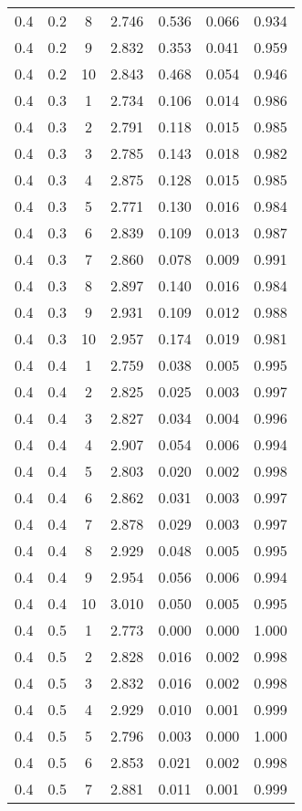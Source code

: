 \begin{tabular}{|c|c|c|c|c|c|c|}
0.4 & 0.2 & 8 & 2.746 & 0.536 & 0.066 & 0.934 \\
0.4 & 0.2 & 9 & 2.832 & 0.353 & 0.041 & 0.959 \\
0.4 & 0.2 & 10 & 2.843 & 0.468 & 0.054 & 0.946 \\
0.4 & 0.3 & 1 & 2.734 & 0.106 & 0.014 & 0.986 \\
0.4 & 0.3 & 2 & 2.791 & 0.118 & 0.015 & 0.985 \\
0.4 & 0.3 & 3 & 2.785 & 0.143 & 0.018 & 0.982 \\
0.4 & 0.3 & 4 & 2.875 & 0.128 & 0.015 & 0.985 \\
0.4 & 0.3 & 5 & 2.771 & 0.130 & 0.016 & 0.984 \\
0.4 & 0.3 & 6 & 2.839 & 0.109 & 0.013 & 0.987 \\
0.4 & 0.3 & 7 & 2.860 & 0.078 & 0.009 & 0.991 \\
0.4 & 0.3 & 8 & 2.897 & 0.140 & 0.016 & 0.984 \\
0.4 & 0.3 & 9 & 2.931 & 0.109 & 0.012 & 0.988 \\
0.4 & 0.3 & 10 & 2.957 & 0.174 & 0.019 & 0.981 \\
0.4 & 0.4 & 1 & 2.759 & 0.038 & 0.005 & 0.995 \\
0.4 & 0.4 & 2 & 2.825 & 0.025 & 0.003 & 0.997 \\
0.4 & 0.4 & 3 & 2.827 & 0.034 & 0.004 & 0.996 \\
0.4 & 0.4 & 4 & 2.907 & 0.054 & 0.006 & 0.994 \\
0.4 & 0.4 & 5 & 2.803 & 0.020 & 0.002 & 0.998 \\
0.4 & 0.4 & 6 & 2.862 & 0.031 & 0.003 & 0.997 \\
0.4 & 0.4 & 7 & 2.878 & 0.029 & 0.003 & 0.997 \\
0.4 & 0.4 & 8 & 2.929 & 0.048 & 0.005 & 0.995 \\
0.4 & 0.4 & 9 & 2.954 & 0.056 & 0.006 & 0.994 \\
0.4 & 0.4 & 10 & 3.010 & 0.050 & 0.005 & 0.995 \\
0.4 & 0.5 & 1 & 2.773 & 0.000 & 0.000 & 1.000 \\
0.4 & 0.5 & 2 & 2.828 & 0.016 & 0.002 & 0.998 \\
0.4 & 0.5 & 3 & 2.832 & 0.016 & 0.002 & 0.998 \\
0.4 & 0.5 & 4 & 2.929 & 0.010 & 0.001 & 0.999 \\
0.4 & 0.5 & 5 & 2.796 & 0.003 & 0.000 & 1.000 \\
0.4 & 0.5 & 6 & 2.853 & 0.021 & 0.002 & 0.998 \\
0.4 & 0.5 & 7 & 2.881 & 0.011 & 0.001 & 0.999 \\

\end{tabular}
